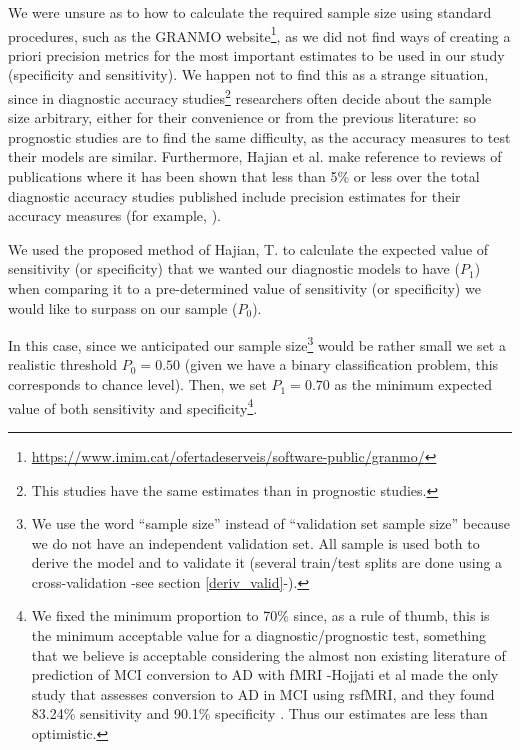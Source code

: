 \documentclass[a4paper,12pt]{elsarticle}  %
\begin{document}
We were unsure as to how to calculate the required sample size using standard procedures, such as the GRANMO website\footnote{\href{https://www.imim.cat/ofertadeserveis/software-public/granmo/}{https://www.imim.cat/ofertadeserveis/software-public/granmo/}}, as we did not find ways of creating a priori precision metrics for the most important estimates to be used in our study (specificity and sensitivity). We happen not to find this as a strange situation, since in diagnostic accuracy studies\footnote{This studies have the same estimates than in prognostic studies.} researchers often decide about the sample size arbitrary, either for their convenience or from the previous literature\cite{Hajian-Tilaki2014193}: so prognostic studies are to find the same difficulty, as the accuracy measures to test their models are similar. Furthermore, Hajian et al.\cite{Hajian-Tilaki2014193} make reference to reviews of publications where it has been shown that less than 5\% or less over the total diagnostic accuracy studies published include precision estimates for their accuracy measures (for example, \cite{Bochmann2007898, Bachmann20061127}).

We used the proposed method of Hajian, T. \cite{Hajian-Tilaki2014193} to calculate the expected value of sensitivity (or specificity) that we wanted our diagnostic models to have ($P_{1}$) when comparing it to a pre-determined value of sensitivity (or specificity) we would like to surpass on our sample ($P_{0}$).

In this case, since we anticipated our sample size\footnote{We use the word ``sample size'' instead of ``validation set sample size'' because we do not have an independent validation set. All sample is used both to derive the model and to validate it (several train/test splits are done using a cross-validation -see section \ref{deriv_valid}-).} 
would be rather small we set a realistic threshold $P_{0} = 0.50$ (given we have a binary classification problem, this corresponds to chance level). Then, we set $P_{1} = 0.70$ as the minimum expected value of both sensitivity and specificity\footnote{We fixed the minimum proportion to 70\% since, as a rule of thumb, this is the minimum acceptable value for a diagnostic/prognostic test, something that we believe is acceptable considering the almost non existing literature of prediction of MCI conversion to AD with fMRI -Hojjati et al made the only study that assesses conversion to AD in MCI using rsfMRI, and they found 83.24\% sensitivity and 90.1\% specificity \cite{Hojjati201769}. Thus our estimates are less than optimistic.}.
\end{document}

